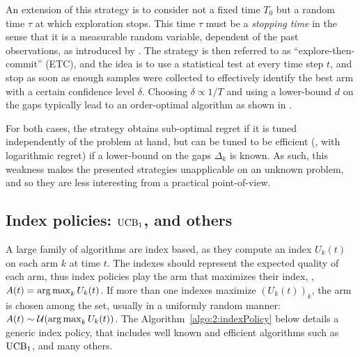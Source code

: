 An extension of this strategy is to consider not a fixed time $T_0$ but a random time $\tau$ at which exploration stops.
This time $\tau$ must be a \emph{stopping time} in the sense that it is a measurable random variable, dependent of the past observations, as introduced by \cite{Wald45}. The strategy is then referred to as ``explore-then-commit'' (ETC), and the idea is to use a statistical test at every time step $t$, and stop as soon as enough samples were collected to effectively identify the best arm with a certain confidence level $\delta$.
Choosing $\delta \propto 1/T$ and using a lower-bound $d$ on the gaps typically lead to an order-optimal algorithm as shown in \cite{GarivierETC2016}.


For both cases, the strategy obtains sub-optimal regret if it is tuned independently of the problem at hand, but can be tuned to be efficient (\ie, with logarithmic regret) if a lower-bound on the gaps $\Delta_k$ is known.
As such, this weakness makes the presented strategies unapplicable on an unknown problem, and so they are less interesting from a practical point-of-view.


\subsection{Index policies: $\mathrm{UCB}_1$, \klUCB{} and others}

A large family of algorithms are index based, as they compute an index $U_k(t)$ on each arm $k$ at time $t$.
The indexes should represent the expected quality of each arm, thus index policies play the arm that maximizes their index, \ie, $A(t) = \operatorname*{arg\,max}_k U_k(t)$.
If more than one indexes maximize $(U_k(t))_k$, the arm is chosen among the set, usually in a uniformly random manner: $A(t) \sim \mathcal{U}(\operatorname*{arg\,max}_k U_k(t))$.
%
The Algorithm~\ref{algo:2:indexPolicy} below details a generic index policy, that includes well known and efficient algorithms such as $\mathrm{UCB}_1$, \klUCB{} and many others.

